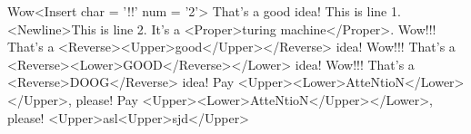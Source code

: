 Wow<Insert char = '!!' num = '2'> That's a good idea!
This is line 1.<Newline>This is line 2.
It's a <Proper>turing machine</Proper>.
Wow!!! That's a <Reverse><Upper>good</Upper></Reverse> idea!
Wow!!! That's a <Reverse><Lower>GOOD</Reverse></Lower> idea!
Wow!!! That's a <Reverse>DOOG</Reverse> idea!
Pay <Upper><Lower>AtteNtioN</Lower></Upper>, please!
Pay <Upper><Lower>AtteNtioN</Upper></Lower>, please!
<Upper>asl<Upper>sjd</Upper>